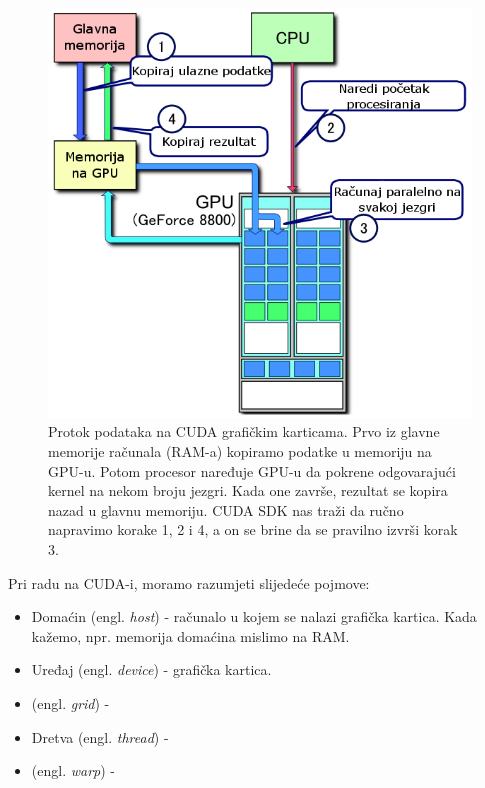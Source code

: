 \documentclass[times, utf8, zavrsni]{fer}
\begin{document}
\begin{figure}
\centering
\includegraphics[scale=0.7]{res/CUDA_processing_flow_(hr).PNG}
\caption[Protok podataka na CUDA grafičkim karticama]{Protok podataka
na CUDA grafičkim karticama. Prvo iz glavne memorije računala (RAM-a)
kopiramo podatke u memoriju na GPU-u. Potom procesor naređuje
GPU-u da pokrene odgovarajući kernel na nekom broju jezgri. 
Kada one završe, rezultat se kopira nazad u glavnu memoriju.
CUDA SDK nas traži da ručno napravimo korake 1, 2 i 4, a on
se brine da se pravilno izvrši korak 3.}
\label{figure:cuda:dataflow}
\end{figure}


Pri radu na CUDA-i, moramo razumjeti slijedeće pojmove:
\begin{itemize}
\item
Domaćin (engl. \textit{host}) - računalo u kojem se nalazi grafička kartica.
Kada kažemo, npr. memorija domaćina mislimo na RAM. 

\item
Uređaj (engl. \textit{device}) - grafička kartica.

\item
(engl. \textit{grid}) - 

\item
Dretva (engl. \textit{thread}) - 

\item
(engl. \textit{warp}) -

\end{itemize}
\end{document}
